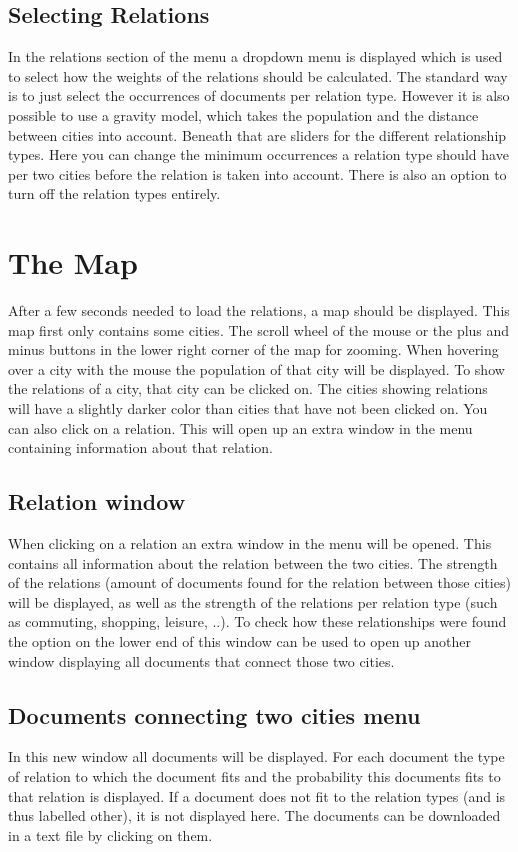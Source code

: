 \subsection{Selecting Relations}
In the relations section of the menu a dropdown menu is displayed which is used to select how the weights of the relations should be calculated. The standard way is to just select the occurrences of documents per relation type. However it is also possible to use a gravity model, which takes the population and the distance between cities into account.  Beneath that are sliders for the different relationship types. Here you can change the minimum occurrences a relation type should have per two cities before the relation is taken into account. There is also an option to turn off the relation types entirely.


\section{The Map}
After a few seconds needed to load the relations, a map should be displayed. This map first only contains some cities. The scroll wheel of the mouse or the plus and minus buttons in the lower right corner of the map for zooming. When hovering over a city with the mouse the population of that city will be displayed. To show the relations of a city, that city can be clicked on. The cities showing relations will have a slightly darker color than cities that have not been clicked on. You can also click on a relation. This will open up an extra window in the menu containing information about that relation.

\subsection{Relation window}
When clicking on a relation an extra window in the menu will be opened. This contains all information about the relation between the two cities. The strength of the relations (amount of documents found for the relation between those cities) will be displayed, as well as the strength of the relations per relation type (such as commuting, shopping, leisure, ..). To check how these relationships were found the option on the lower end of this window  can be used to open up another window displaying all documents that connect those two cities.

\subsection{Documents connecting two cities menu}
In this new window all documents will be displayed. For each document the type of relation to which the document fits and the probability this documents fits to that relation is displayed. If a document does not fit to the relation types (and is thus labelled other), it is not displayed here. The documents can be downloaded in a text file by clicking on them.


